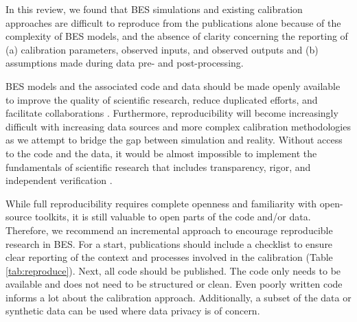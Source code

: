 \documentclass[review]{elsarticle}
\begin{document}
In this review, we found that BES simulations and existing calibration approaches are difficult to reproduce from the publications alone because of the complexity of BES models, and the absence of clarity concerning the reporting of (a) calibration parameters, observed inputs, and observed outputs and (b) assumptions made during data pre- and post-processing.

BES models and the associated code and data should be made openly available to improve the quality of scientific research, reduce duplicated efforts, and facilitate collaborations \cite{pfenninger2017importance}. Furthermore, reproducibility will become increasingly difficult with increasing data sources and more complex calibration methodologies as we attempt to bridge the gap between simulation and reality. Without access to the code and the data, it would be almost impossible to implement the fundamentals of scientific research that includes transparency, rigor, and independent verification \cite{mcnutt2014journals, pfenninger2017importance}. 

While full reproducibility requires complete openness and familiarity with open-source toolkits, it is still valuable to open parts of the code and/or data. Therefore, we recommend an incremental approach to encourage reproducible research in BES. For a start, publications should include a checklist to ensure clear reporting of the context and processes involved in the calibration (Table \ref{tab:reproduce}). Next, all code should be published. The code only needs to be available and does not need to be structured or clean. Even poorly written code informs a lot about the calibration approach. Additionally, a subset of the data or synthetic data can be used where data privacy is of concern. 
\end{document}
